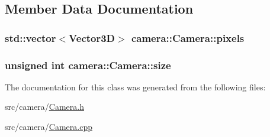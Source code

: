 \subsection{Member Data Documentation}
\subsubsection[{\texorpdfstring{pixels}{pixels}}]{\setlength{\rightskip}{0pt plus 5cm}std\+::vector$<${\bf Vector3D}$>$ camera\+::\+Camera\+::pixels\hspace{0.3cm}{\ttfamily [protected]}}\hypertarget{classcamera_1_1Camera_a53f3fe9b838bc48e9ec21973dc8b516c}{}\label{classcamera_1_1Camera_a53f3fe9b838bc48e9ec21973dc8b516c}
\subsubsection[{\texorpdfstring{size}{size}}]{\setlength{\rightskip}{0pt plus 5cm}unsigned int camera\+::\+Camera\+::size\hspace{0.3cm}{\ttfamily [protected]}}\hypertarget{classcamera_1_1Camera_ac05b929c8b4f40d74ee682c4aad4c53d}{}\label{classcamera_1_1Camera_ac05b929c8b4f40d74ee682c4aad4c53d}


The documentation for this class was generated from the following files\+:\begin{DoxyCompactItemize}
\item 
src/camera/\hyperlink{Camera_8h}{Camera.\+h}\item 
src/camera/\hyperlink{Camera_8cpp}{Camera.\+cpp}\end{DoxyCompactItemize}
